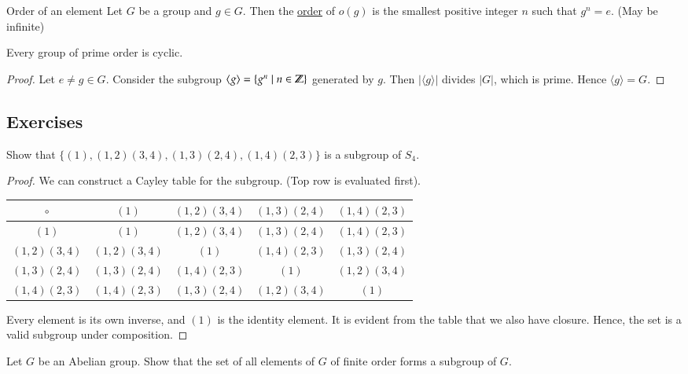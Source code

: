 \begin{defn}{Order of an element}
Let $G$ be a group and $g\in G$. Then the \ul{order} of $o(g)$ is the smallest positive integer $n$ such that $g^n=e$. (May be infinite)
\end{defn}

\begin{proposition}
	Every group of prime order is cyclic. 
\end{proposition}
\begin{proof}
Let $e\neq g\in G$. Consider the subgroup $\langle g \rangle =\{g^n\mid n\in \mathbb{Z}\}$ generated by $g$. Then $|\langle g \rangle|$ divides $|G|$, which is prime. Hence $\langle g \rangle = G$. 
\end{proof}

\subsection{Exercises}

Show that $\{(1), (1, 2)(3, 4), (1, 3)(2, 4), (1, 4)(2, 3)\}$ is a subgroup of $S_4$. 

\begin{proof}
We can construct a Cayley table for the subgroup. (Top row is evaluated first). 

\begin{center}
\begin{tabular}{c|cccc}
$\circ$        & $(1)$          & $(1, 2)(3, 4)$ & $(1, 3)(2, 4)$ & $(1, 4)(2, 3)$ \\ \hline
$(1)$          & $(1)$          & $(1, 2)(3, 4)$ & $(1, 3)(2, 4)$ & $(1, 4)(2, 3)$ \\
$(1, 2)(3, 4)$ & $(1, 2)(3, 4)$ & $(1)$          & $(1, 4)(2, 3)$ & $(1, 3)(2, 4)$ \\
$(1, 3)(2, 4)$ & $(1, 3)(2, 4)$ & $(1, 4)(2, 3)$ & $(1)$          & $(1, 2)(3, 4)$ \\
$(1, 4)(2, 3)$ & $(1, 4)(2, 3)$ & $(1, 3)(2, 4)$ & $(1, 2)(3, 4)$ & $(1)$         
\end{tabular}
\end{center}

Every element is its own inverse, and $(1)$ is the identity element. It is evident from the table that we also have closure. Hence, the set is a valid subgroup under composition. 
\end{proof}

Let $G$ be an Abelian group. Show that the set of all elements of $G$ of finite order forms a subgroup of $G$. 


